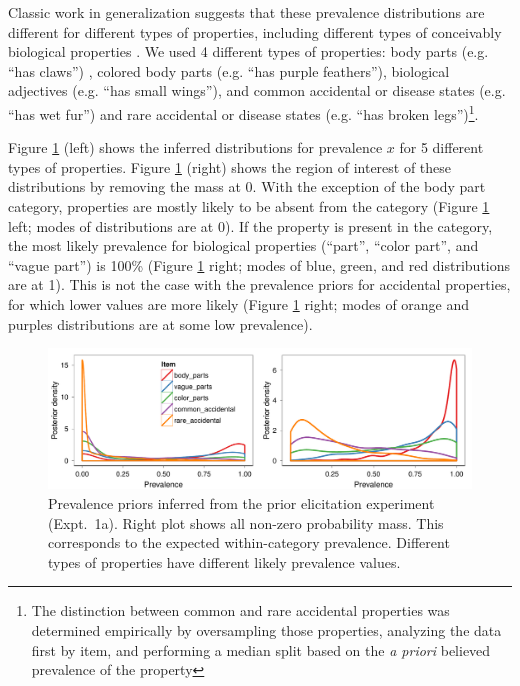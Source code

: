 \documentclass[10pt,letterpaper]{article}
\begin{document}
Classic work in generalization suggests that these prevalence distributions are different for different types of properties, including different types of conceivably biological properties \cite{Nisbett1983}. 
We used 4 different types of properties: body parts (e.g. ``has claws'') , colored body parts (e.g. ``has purple feathers''), biological adjectives (e.g. ``has small wings''), and common accidental or disease states (e.g. ``has wet fur'') and rare accidental or disease states (e.g. ``has broken legs'')\footnote{The distinction between common and rare accidental properties was determined empirically by oversampling those properties, analyzing the data first by item, and performing a median split based on the \emph{a priori} believed prevalence of the property}.

Figure \ref{fig:prior2} (left) shows the inferred distributions for prevalence $x$ for 5 different types of properties. 
Figure \ref{fig:prior2} (right) shows the region of interest of these distributions by removing the mass at 0. 
With the exception of the body part category, properties are mostly likely to be absent from the category (Figure \ref{fig:prior2} left; modes of distributions are at 0).
If the property is present in the category, the most likely prevalence for biological properties (``part'', ``color part'', and ``vague part'') is 100\% (Figure \ref{fig:prior2} right; modes of blue, green, and red distributions are at 1).
This is not the case with the prevalence priors for accidental properties, for which lower values are more likely (Figure \ref{fig:prior2} right; modes of orange and purples distributions are at some low prevalence).


\begin{figure}
\centering
    \includegraphics[width=\columnwidth]{prior2_prevalenceprior-50k.pdf}
    \caption{Prevalence priors inferred from the prior elicitation experiment  (Expt.~1a). Right plot shows all non-zero probability mass. This corresponds to the expected within-category prevalence. Different types of properties have different likely prevalence values.}
  \label{fig:prior2}
\end{figure}
\end{document}
